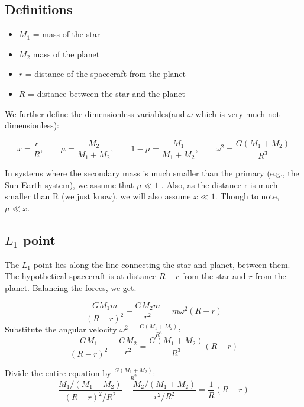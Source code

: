 \documentclass[10pt, a4paper]{article}
\begin{document}
\subsection*{Definitions}

\begin{itemize}
    \item $M_1$ = mass of the star
    \item $M_2$ mass of the planet
    \item $r$ = distance of the spacecraft from the planet
    \item $R$ = distance between the star and the planet
\end{itemize}

We further define the dimensionless variables(and $\omega$ which is very much not dimensionless):

\begin{equation*}
    x = \frac{r}{R}, \qquad
    \mu = \frac{M_2}{M_1 + M_2}, \qquad
    1 - \mu = \frac{M_1}{M_1 + M_2}, \qquad
    \omega^2 = \frac{G(M_1+M_2)}{R^3}
\end{equation*}

In systems where the secondary mass is much smaller than the primary (e.g., the Sun-Earth system), we assume that  $\mu \ll 1$ . Also, as the distance r is much smaller than R (we just know), we will also assume  $x \ll 1$. Though to note,  $\mu \ll x$.

\subsection*{$L_1$ point}

The $L_1$ point lies along the line connecting the star and planet, between
them. The hypothetical spacecraft is at distance $R - r$ from the star and $r$ from the
planet. Balancing the forces, we get.

\begin{equation*}
    \frac{GM_1 m}{(R-r)^2} - \frac{GM_2 m}{r^2} = m\omega^2(R-r)
\end{equation*}
Substitute the angular velocity $\omega^2 = \frac{G(M_1 + M_2)}{R^3}$:
\begin{equation*}
\frac{G M_1}{(R-r)^2} - \frac{G M_2}{r^2} = \frac{G(M_1 + M_2)}{R^3} (R - r)
\end{equation*}

Divide the entire equation by $\frac{G(M_1 + M_2)}{R^2}$:
\begin{equation*}
\frac{M_1/(M_1+M_2)}{(R-r)^2/R^2} - \frac{M_2/(M_1+M_2)}{r^2/R^2} = \frac{1}{R} (R - r)
\end{equation*}
\end{document}
